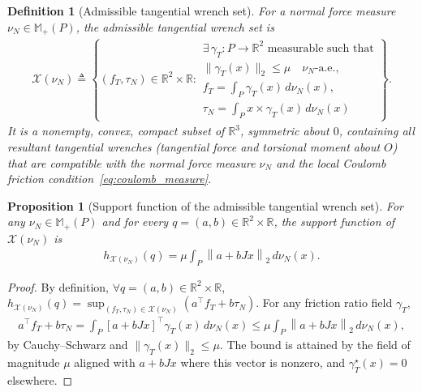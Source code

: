 \documentclass[11pt,a4paper]{article}
\theoremstyle{plain}
\newtheorem{proposition}[theorem]{Proposition}
\newtheorem{definition}[theorem]{Definition}
\newcommand{\R}{\mathbb{R}}
\newcommand{\X}{\mathcal X}
\begin{document}
\begin{definition}[Admissible tangential wrench set]
    \label{def:wrench_set}
    For a normal force measure $\nu_N\in\mathbb M_+(P)$, the \textit{admissible tangential wrench set} is
    \begin{align}
    \X(\nu_N)
    \triangleq
    \left\{
    (f_T,\tau_N)\in\mathbb R^2\times\mathbb R:
    \begin{array}{l}
    \exists\,\gamma_T:P\rightarrow\mathbb R^2
    \text{ measurable such that}\\
    \|\gamma_T(x)\|_2\le\mu
    \quad\nu_N\text{-a.e.},\\
    f_T=\displaystyle\int_P\gamma_T(x)\,d\nu_N(x),\\
    \tau_N=\displaystyle\int_P
    x\times\gamma_T(x)\,d\nu_N(x)
    \end{array}
    \right\}.
    \end{align}
    It is a nonempty, convex, compact subset of $\R^3$, symmetric about $0$, containing all resultant tangential wrenches (tangential force and torsional moment about $O$) that are
    compatible with the normal force measure $\nu_N$ and the local Coulomb friction condition~\eqref{eq:coulomb_measure}.
\end{definition}

\begin{proposition}[Support function of the admissible tangential wrench set]
    \label{prop:support}
    For any $\nu_N\in\mathbb M_+(P)$ and for every $q=(a,b)\in\mathbb R^2\times\mathbb R$, the support function of $\X(\nu_N)$ is
    \begin{align}
    h_{\X(\nu_N)}(q) = \mu \int_P \left\|a+bJx\right\|_2\,d\nu_N(x).
    \end{align}
\end{proposition}
\begin{proof}
    By definition, $\forall q=(a,b)\in\R^2\times \R$,
    $h_{\X(\nu_N)}(q) =\sup_{(f_T,\tau_N)\in\X(\nu_N)}\left(a^\top f_T+b\tau_N\right)$.
    For any friction ratio field $\gamma_T$,
    \begin{align}
    a^\top f_T+b\tau_N=\int_P\left[a+bJx\right]^\top\gamma_T(x)\,d\nu_N(x)
    \le\mu\int_P\left\|a+bJx\right\|_2\,d\nu_N(x),
    \end{align}
    by Cauchy--Schwarz and $\|\gamma_T(x)\|_2\le\mu$.
    The bound is attained by the field of magnitude $\mu$ aligned with $a+bJx$ where this vector is nonzero, and $\gamma_T^\star(x)=0$ elsewhere.
\end{proof}
\end{document}
